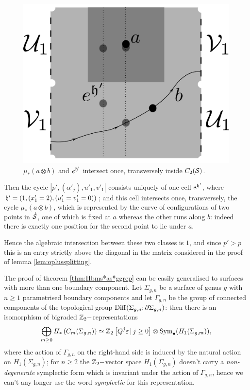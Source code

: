 \begin{figure}\centering
 \includegraphics[scale=0.6]{figures/counterexample.png}
 \caption{$\mu_*(a\otimes b)$ and $e^{\tup'}$ intersect once, transversely inside $C_2(\S)$.}
\label{fig:counterexample}
\end{figure}

Then the cycle $|p',(\alpha'_j),u'_1,v'_1|$ consists uniquely of one cell $e^{\tup'}$, where
$\tup'=(1,(x'_1=2),(u'_1=v'_1=0))$; and this cell intersects once, transversely,
the cycle $\mu_*(a\otimes b)$, which is represented by the curve of configurations of two
points in $\mrS$, one of which is fixed at $a$ whereas the other runs along $b$: indeed
there is exactly one position for the second point to lie under $a$.

Hence the algebraic intersection between these two classes is $1$, and since $p'>p$
this is an entry strictly above the diagonal in the matrix considered in the proof
of lemma \ref{lem:oplussplitting}.

The proof of theorem \ref{thm:Hbms*as*ggrep} can be easily generalised to surfaces
with more than one boundary component. Let $\Sigma_{g,n}$ be a surface of genus
$g$ with $n\geq 1$ parametrised boundary components and let $\Gamma_{g,n}$ be
the group of connected components of the topological group
$\Diff(\Sigma_{g,n};\partial\Sigma_{g,n})$:
then there is an isomorphism of bigraded $\Z_2-$representations
\[
 \bigoplus_{m\geq 0}H_*\pa{C_m(\Sigma_{g,n})}\simeq \Z_2\left[Q^j\epsilon\,|\, j\geq 0\right]\otimes\Sym_{\bullet}(H_1(\Sigma_{g,m})),
\]
where the action of $\Gamma_{g,n}$ on the right-hand side is induced by the natural
action on $H_1(\Sigma_{g,n})$; for $n\geq 2$ the $\Z_2-$vector space $H_1(\Sigma_{g,n})$
doesn't carry a \emph{non-degenerate} symplectic form which is invariant under the action of
$\Gamma_{g,n}$, hence we can't any longer use the word \emph{symplectic} for this representation.


